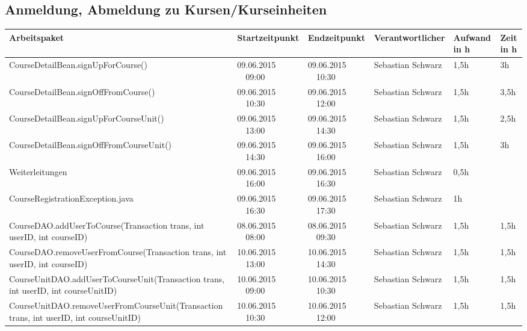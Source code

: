 \begin{landscape}
	\subsection{Anmeldung, Abmeldung zu Kursen/Kurseinheiten}
    \begin{tabular}{|p{10.3cm}|p{3.2cm}|p{3.2cm}|p{3.5cm}|p{1.7cm}|p{1.5cm}|}
	\hline  \textbf{Arbeitspaket} & \textbf{Startzeitpunkt} & \textbf{Endzeitpunkt} & \textbf{Verantwortlicher}  & \textbf{Aufwand in h} & \textbf{Zeit in h}\\
		\hline   CourseDetailBean.signUpForCourse()                          & 09.06.2015 \ \ 09:00       & 09.06.2015 \ \ 10:30        & Sebastian Schwarz & 1,5h                 & 3h\\
		\hline   CourseDetailBean.signOffFromCourse()                        & 09.06.2015 \ \ 10:30       & 09.06.2015 \ \ 12:00        & Sebastian Schwarz & 1,5h                 & 3,5h\\
		\hline   CourseDetailBean.signUpForCourseUnit()                      & 09.06.2015 \ \ 13:00       & 09.06.2015 \ \ 14:30        & Sebastian Schwarz & 1,5h                 & 2,5h\\
		\hline   CourseDetailBean.signOffFromCourseUnit()                    & 09.06.2015 \ \ 14:30       & 09.06.2015 \ \ 16:00        & Sebastian Schwarz & 1,5h                 & 3h\\
		\hline   Weiterleitungen                                             & 09.06.2015 \ \ 16:00       & 09.06.2015 \ \ 16:30        & Sebastian Schwarz & 0,5h                 &\\
		\hline   CourseRegistrationException.java                            & 09.06.2015 \ \ 16:30       & 09.06.2015 \ \ 17:30        & Sebastian Schwarz & 1h                 &\\
		\hline   CourseDAO.addUserToCourse(Transaction trans, int userID, int courseID)            & 08.06.2015 \ \ 08:00       & 08.06.2015 \ \ 09:30      & Sebastian Schwarz  & 1,5h                 & 1,5h\\
		\hline   CourseDAO.removeUserFromCourse(Transaction trans, int userID, int courseID)       & 10.06.2015 \ \ 13:00       & 10.06.2015 \ \ 14:30      & Sebastian Schwarz  & 1,5h                 & 1,5h\\
		\hline   CourseUnitDAO.addUserToCourseUnit(Transaction trans, int userID, int courseUnitID)& 10.06.2015 \ \ 09:00       & 10.06.2015 \ \ 10:30      & Sebastian Schwarz  & 1,5h                 & 1,5h\\
		\hline   CourseUnitDAO.removeUserFromCourseUnit(Transaction trans, int userID, int courseUnitID) & 10.06.2015 \ \ 10:30       & 10.06.2015 \ \ 12:00  & Sebastian Schwarz & 1,5h                 & 1,5h\\

\end{tabular}
\end{landscape}
